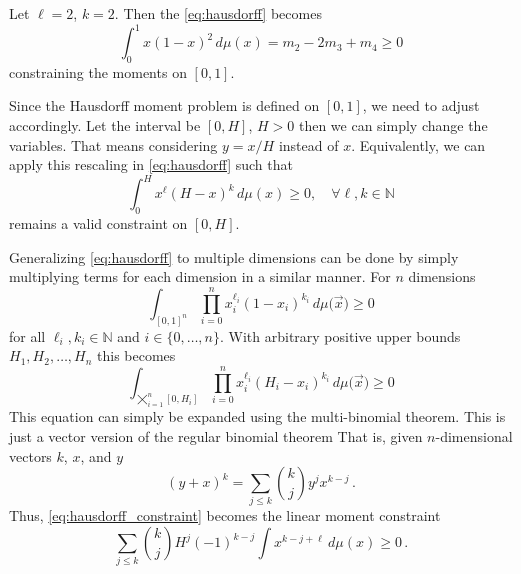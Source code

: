 \begin{example}
	Let $\ell = 2$, $k=2$. Then the \eqref{eq:hausdorff} becomes
	\[
		\int_0^1 x (1 - x)^2 \,d\mu(x) =
		m_2 - 2 m_3 + m_4 \geq 0
	\]
	constraining the moments on $[0,1]$.
\end{example}

Since the Hausdorff moment problem is defined on $[0,1]$, we need to adjust accordingly.
Let the interval be $[0,H]$, $H>0$ then we can simply change the variables.
That means considering $y=x/H$ instead of $x$.
Equivalently, we can apply this rescaling in \eqref{eq:hausdorff} such that
\begin{equation}\label{eq:hausdorff_scaled}
	\int_0^H x^\ell(H-x)^k\,d\mu(x) \geq 0, \quad \forall \ell, k\in\mathbb{N}
\end{equation}
remains a valid constraint on $[0,H]$.

Generalizing \eqref{eq:hausdorff} to multiple dimensions can be done by simply multiplying terms
for each dimension in a similar manner.
For $n$ dimensions
\begin{equation*}
	\int_{{[0,1]}^n}\prod_{i = 0}^n x_i^{\ell_i}{(1-x_i)}^{k_i}\,d\mu{(\vec{x}})\geq 0
\end{equation*}
for all $\ell_i, k_i\in\mathbb{N}$ and $i\in \{0,\dotsc, n\}$.
With arbitrary positive upper bounds $H_1, H_2, \dotsc, H_n$ this becomes
\begin{equation}\label{eq:hausdorff_constraint}
    \int_{\bigtimes_{i=1}^n[0,H_i]}\prod_{i = 0}^n x_i^{\ell_i}{(H_i-x_i)}^{k_i}\,d\mu{(\vec{x}})\geq 0
\end{equation}
This equation can simply be expanded using the multi-binomial theorem. %
This is just a vector version of the regular binomial theorem
That is, given $n$-dimensional vectors $k$, $x$, and $y$
\[
    (y+x)^{k} =
    \sum_{j\leq k}
    \binom{k}{j} y^{j}x^{k-j}\,.
\]
Thus, \eqref{eq:hausdorff_constraint} becomes the linear moment constraint
\begin{equation}\label{eq:hausdorff_appl}
    \sum_{j\leq k}
    \binom{k}{j}
    H^j (-1)^{k-j}
    \int
    x^{k-j+\ell} \,d\mu(x)\geq 0\,.
\end{equation}


